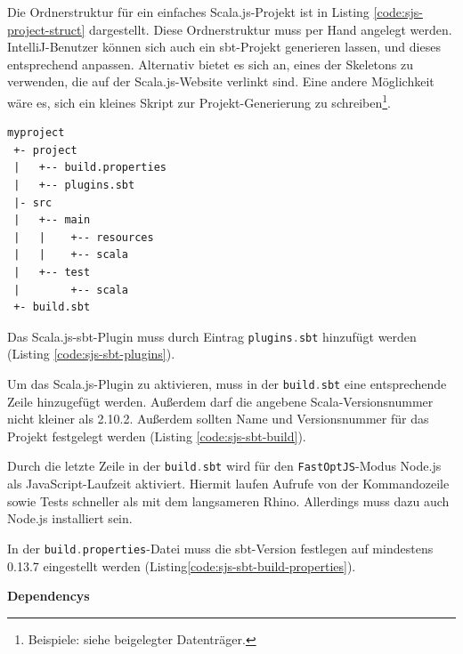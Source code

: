\documentclass[a4paper, 12pt, hidelinks, listof=totoc, listoftables=totoc, bibliography=totoc]{scrreprt}
\newcommand{\code}[1]{\lstinline[language=Scala, style=inline]|#1|}
\newcommand{\MyMiniSec}[1]{\rmfamily\fontsize{12}{15}\selectfont
	\vspace{7pt}\textbf{#1} %
}
\begin{document}
Die Ordnerstruktur für ein einfaches Scala.js-Projekt ist in Listing \ref{code:sjs-project-struct} dargestellt. Diese Ordnerstruktur muss per Hand angelegt werden. IntelliJ-Benutzer können sich auch ein sbt-Projekt generieren lassen, und dieses entsprechend anpassen. Alternativ bietet es sich an, eines der Skeletons zu verwenden, die auf der Scala.js-Website verlinkt sind. Eine andere Möglichkeit wäre es, sich ein kleines Skript zur Projekt-Generierung zu schreiben\footnote{Beispiele: siehe beigelegter Datenträger.}.

\begin{lstlisting}[caption={Struktur eines einfachen Scala.js Projekts.}, label={code:sjs-project-struct}]
myproject
 +- project
 |   +-- build.properties
 |   +-- plugins.sbt
 |- src
 |   +-- main
 |   |    +-- resources
 |   |    +-- scala
 |   +-- test
 |        +-- scala
 +- build.sbt
\end{lstlisting}

Das Scala.js-sbt-Plugin muss durch Eintrag \code{plugins.sbt} hinzufügt werden (Listing \ref{code:sjs-sbt-plugins}).



Um das Scala.js-Plugin zu aktivieren, muss in der \code{build.sbt} eine entsprechende Zeile hinzugefügt werden. Außerdem darf die angebene Scala-Versionsnummer nicht kleiner als 2.10.2. Außerdem sollten Name und Versionsnummer für das Projekt festgelegt werden (Listing \ref{code:sjs-sbt-build}).



Durch die letzte Zeile in der \code{build.sbt} wird für den \code{FastOptJS}-Modus Node.js als JavaScript-Laufzeit aktiviert. Hiermit laufen Aufrufe von der Kommandozeile sowie Tests schneller als mit dem langsameren Rhino. Allerdings muss dazu auch Node.js installiert sein.



In der \code{build.properties}-Datei muss die sbt-Version festlegen auf mindestens 0.13.7 eingestellt werden (Listing\ref{code:sjs-sbt-build-properties}).


\MyMiniSec{Dependencys}
\end{document}
